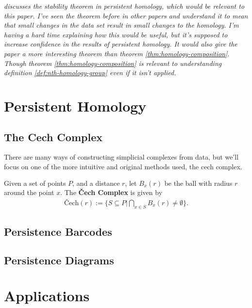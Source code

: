 \textit{\cite{cohen-steiner} discusses the stability theorem in persistent homology, which would be relevant to this paper. I've seen the theorem before in other papers and understand it to mean that small changes in the data set result in small changes to the homology. I'm having a hard time explaining how this would be useful, but it's supposed to increase confidence in the results of persistent homology. It would also give the paper a more interesting theorem than theorem \ref{thm:homology-composition}. Though theorem \ref{thm:homology-composition} is relevant to understanding definition \ref{def:nth-homology-group} even if it isn't applied.}

\section{Persistent Homology}\label{sec:persistent-homology}

\subsection{The Cech Complex}\label{sec:cech-complex}

There are many ways of constructing simplicial complexes from data, but we'll focus on one of the more intuitive and original methods used, the cech complex.

\begin{definition}\label{def:cech-complex}
    Given a set of points \(P\), and a distance \(r\), let \(B_x(r)\) be the ball with radius \(r\) around the point \(x\). The \textbf{\v{C}ech Complex} is given by
		\begin{align*}
            \textrm{\v{C}ech}(r) := \{ S \subseteq P | \bigcap_{x\in S} B_x(r) \neq \emptyset \}
            .
		\end{align*}
		\cite{wagner}
\end{definition}

\subsection{Persistence Barcodes}

\subsection{Persistence Diagrams}

\section{Applications}\label{sec:applications}






